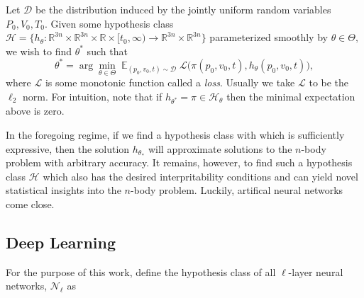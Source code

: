 \documentclass{article}
\numberwithin{theorem}{section}
\numberwithin{equation}{section}
\def\scripth{{\mathcal H}}
\def\scriptd{{\mathcal D}}
\def\scriptl{{\mathcal L}}
\def\scriptn{{\mathcal N}}
\begin{document}
 Let $\scriptd$ be the distribution induced by the jointly uniform random variables $P_0, V_0, T_0$. Given some hypothesis class $\scripth = \{h_\theta: \mathbb{R}^{3n} \times \mathbb{R}^{3n} \times \mathbb{R}
\times  [t_0, \infty)  \to  \mathbb{R}^{3n} \times \mathbb{R}^{3n} \}$ parameterized smoothly by $\theta \in \Theta,$ we wish to find $\theta^*$ such that
 \begin{equation}
 	\theta^* = \arg\min_{\theta \in \Theta} \mathop{\mathbb{E}}_{(p_0, v_0, t) \sim \scriptd}\scriptl \Big( \pi(p_0,v_0,t), h_\theta(p_0, v_0, t)\Big),
 \end{equation}
 where $\scriptl$ is some monotonic function called a \emph{loss}. Usually we take $ \scriptl$ to be the $\ell_2$ norm.
 For intuition, note that if $h_{\theta^{*}} = \pi \in \scripth_\theta$ then the minimal expectation above is zero.

 In the foregoing regime, if we find a hypothesis class with which is sufficiently expressive, then the solution $h_{\theta_*}$ will approximate solutions to the $n$-body problem with arbitrary accuracy. It remains, however, to find such a hypothesis class $\scripth$ which also has the desired interpritability conditions and can yield novel statistical insights into the $n$-body problem. Luckily, artifical neural networks come close.

 \subsection{Deep Learning}

 For the purpose of this work, define the hypothesis class of all $\ell$-layer neural networks, $\scriptn_\ell$ as 


% 
% 
% 
% 
% 
% 

% 
% 
% 
\end{document}
